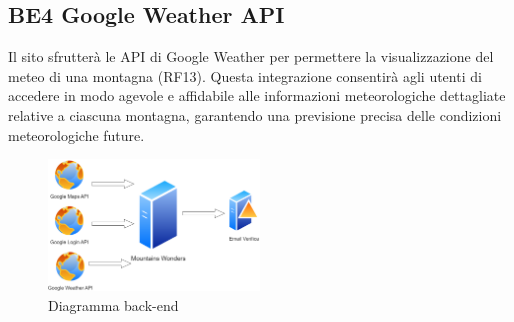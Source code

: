 \documentclass[a4paper,12pt]{article}
\begin{document}
\subsection*{BE4 Google Weather API}
Il sito sfrutterà le API di Google Weather per permettere la visualizzazione del meteo di una montagna (RF13). Questa integrazione consentirà agli utenti di accedere in modo agevole e affidabile alle informazioni meteorologiche dettagliate relative a ciascuna montagna, garantendo una previsione precisa delle condizioni meteorologiche future.
\begin{figure}[H]
   \centering
    \includegraphics[width=0.5\textwidth]{img/Backend-diagram.png}
    \caption{Diagramma back-end}
\end{figure}
\end{document}
